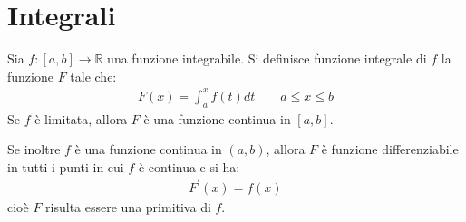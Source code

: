 \section{Integrali}

\begin{thm}
	Sia $f\colon [a,b]\to\mathbb{R}$ una funzione integrabile. Si definisce funzione integrale di $f$ la funzione $F$ tale che:
	\begin{align*}
		F(x)=\int_a^x f(t)dt \qquad a \le x \le b
	\end{align*}
	Se $f$ è limitata, allora $F$ è una funzione continua in $[a,b]$. 

	Se inoltre $f$ è una funzione continua in $(a,b)$, allora $F$ è funzione differenziabile in tutti i punti in cui $f$ è continua e si ha:
	\begin{align*}
		F^\prime(x)=f(x)
	\end{align*}
	cioè $F$ risulta essere una primitiva di $f$.
\end{thm}
